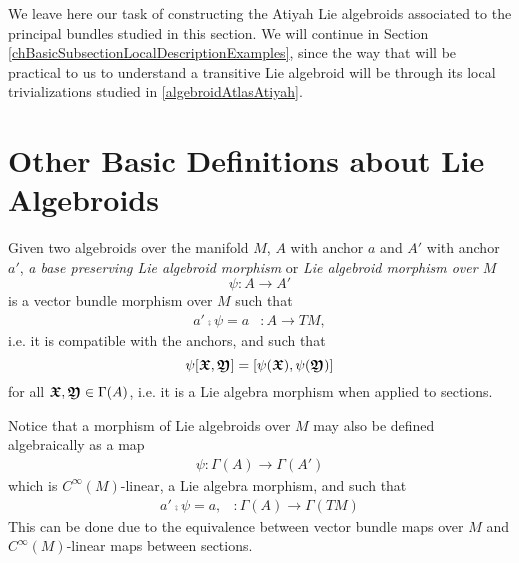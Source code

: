 We leave here our task of constructing the Atiyah Lie algebroids associated to the principal bundles studied in this section. We will continue in Section \ref{chBasicSubsectionLocalDescriptionExamples}, since the way that will be practical to us to understand a transitive Lie algebroid will be through its local trivializations studied in \ref{algebroidAtlasAtiyah}.

\section{Other Basic Definitions about Lie Algebroids}
\begin{definition}  \label{defnMorph}
Given two algebroids over the manifold $M$, $A$ with anchor $a$ and $A'$ with anchor $a'$, \emph{a base preserving Lie algebroid morphism} or \emph{Lie algebroid morphism over $M$} 
\[\psi: A \to A'\]
is a vector bundle morphism over $M$ such that 
\begin{align}
    a' \comp \psi = a & : A \to TM,
\end{align}
i.e. it is compatible with the anchors, and such that 
\[\psi[\bm{\mathfrak{X}}, \bm{\mathfrak{Y}}] = [\psi(\bm{\mathfrak{X}}), \psi(\bm{\mathfrak{Y}})]\] 
for all $\bm{\mathfrak{X}}, \bm{\mathfrak{Y}} \in \Gamma(A)$, i.e. it is a Lie algebra morphism when applied to sections. 
\end{definition}

\begin{remark}
Notice that a morphism of Lie algebroids over $M$ may also be defined algebraically as a map
\begin{align*}
    \psi: \Gamma(A) \to \Gamma(A')
\end{align*}
which is $C^\infty(M)$-linear, a Lie algebra morphism, and such that
\begin{align*}
    a' \comp \psi = a, & :\Gamma(A) \to \Gamma(TM)
\end{align*}
This can be done due to the equivalence between vector bundle maps over $M$ and $C^\infty(M)$-linear maps between sections.
\end{remark}

